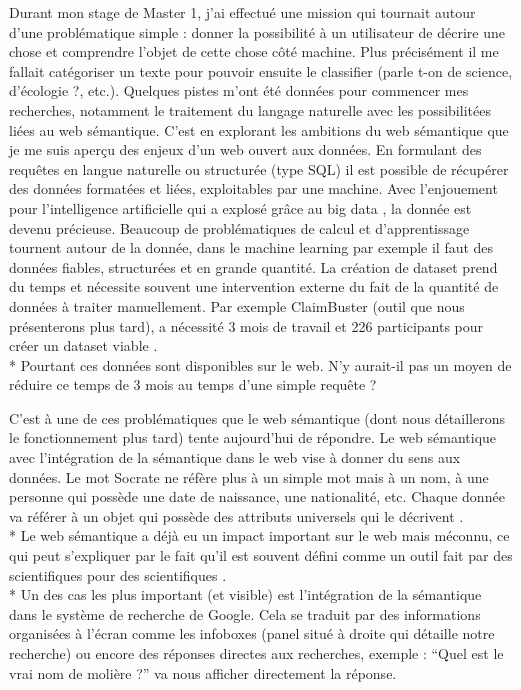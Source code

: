 Durant mon stage de Master 1, j'ai effectué une mission qui tournait autour d'une problématique simple : donner la possibilité à un utilisateur de décrire une chose et comprendre l'objet de cette chose côté machine. Plus précisément il me fallait catégoriser un texte pour pouvoir ensuite le classifier (parle t-on de science, d'écologie ?, etc.). Quelques pistes m'ont été données pour commencer mes recherches, notamment le traitement du langage naturelle avec les possibilitées liées au web sémantique. C'est en explorant les ambitions du web sémantique que je me suis aperçu des enjeux d'un web ouvert aux données. En formulant des requêtes en langue naturelle ou structurée (type SQL) il est possible de récupérer des données formatées et liées, exploitables par une machine. Avec l'enjouement pour l'intelligence artificielle qui a explosé grâce au big data \cite{sh}, la donnée est devenu précieuse. Beaucoup de problématiques de calcul et d'apprentissage tournent autour de la donnée, dans le machine learning par exemple il faut des données fiables, structurées et en grande quantité. La création de dataset prend du temps et nécessite souvent une intervention externe du fait de la quantité de données à traiter manuellement. Par exemple ClaimBuster (outil que nous présenterons plus tard), a nécessité 3 mois de travail et 226 participants pour créer un dataset viable \cite{hassan2015quest}.
\\*
Pourtant ces données sont disponibles sur le web. N'y aurait-il pas un moyen de réduire ce temps de 3 mois au temps d'une simple requête ?

C'est à une de ces problématiques que le web sémantique (dont nous détaillerons le fonctionnement plus tard) tente aujourd'hui de répondre. Le web sémantique avec l'intégration de la sémantique dans le web vise à donner du sens aux données. Le mot Socrate ne réfère plus à un simple mot mais à un nom, à une personne qui possède une date de naissance, une nationalité, etc. Chaque donnée va référer à un objet qui possède des attributs universels qui le décrivent \cite{schemaPerson}.
\\*
Le web sémantique a déjà eu un impact important sur le web mais méconnu, ce qui peut s'expliquer par le fait qu'il est souvent défini comme un outil fait par des scientifiques pour des scientifiques \cite{semantic_web_has_failed}.
\\*
Un des cas les plus important (et visible) est l'intégration de la sémantique dans le système de recherche de Google. Cela se traduit par des informations organisées à l'écran comme les infoboxes (panel situé à droite qui détaille notre recherche) ou encore des réponses directes aux recherches, exemple : \enquote{Quel est le vrai nom de molière ?} va nous afficher directement la réponse.

